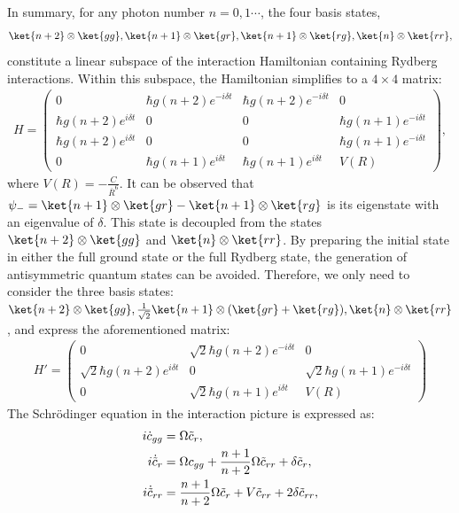 \documentclass[11pt]{article}
\begin{document}
In summary, for any photon number $n = 0,1 \cdots$, the four basis states,
$${\ket{n+2}\otimes \ket{gg}, \ket{n+1}\otimes \ket{gr}, \ket {n+1} \otimes \ket{rg}, \ket{n} \otimes \ket{rr}},$$
constitute a linear subspace of the interaction Hamiltonian containing Rydberg interactions. Within this subspace, the Hamiltonian simplifies to a $4 \times 4$ matrix:
\begin{align}
    H = \begin{pmatrix}
        0 & \hbar g(n+2)e^{-i\delta t} & \hbar g(n+2)e^{-i\delta t} & 0 \\
        \hbar g(n+2)e^{i\delta t} & 0 & 0 & \hbar g(n+1)e^{-i\delta t} \\
        \hbar g(n+2)e^{i\delta t} & 0 & 0 & \hbar g(n+1)e^{-i\delta t} \\
        0 & \hbar g(n+1)e^{i\delta t} &\hbar g(n+1)e^{i\delta t} & V(R) 
    \end{pmatrix},
\end{align}
where $V(R) = -\frac{C}{\bar{R}^6}$. It can be observed that $\psi_- = \ket{n+1}\otimes \ket{gr}- \ket {n+1} \otimes \ket{rg}$ is its eigenstate with an eigenvalue of $\delta$. This state is decoupled from the states $\ket{n+2}\otimes \ket{gg}$ and $\ket{n}\otimes \ket{rr}$. By preparing the initial state in either the full ground state or the full Rydberg state, the generation of antisymmetric quantum states can be avoided. Therefore, we only need to consider the three basis states: ${\ket{n+2}\otimes \ket{gg}, \frac{1}{\sqrt{2}} \ket{n+1}\otimes ( \ket{gr}+\ket{rg}), \ket{n} \otimes \ket{rr}}$, and express the aforementioned matrix:
\begin{align}
    H' = 
    \begin{pmatrix}
        0 & \sqrt{2}\hbar g(n+2)e^{-i\delta t}  & 0 \\
        \sqrt{2}\hbar g(n+2)e^{i\delta t} & 0 & \sqrt{2}\hbar g(n+1) e^{-i\delta t}\\
        0 & \sqrt{2}\hbar g(n+1)e^{i\delta t} &  V(R)  
    \end{pmatrix}
\end{align}
The Schrödinger equation in the interaction picture is expressed as:
\begin{align}
    i\Dot{c}_{gg} &= \Omega \Tilde{c}_r , \\
     i\Dot{ \Tilde{c}}_r &= \Omega  c_{gg} +  \frac{n+1}{n+2}\Omega \Tilde{c}_{rr} +\delta  \Tilde{c}_r , \\
      i\Dot{\Tilde{c}}_{rr} &=  \frac{n+1}{n+2} \Omega  \Tilde{c}_r +  V \Tilde{c}_{rr} + 2\delta \Tilde{c}_{rr} ,
\end{align}
\end{document}
